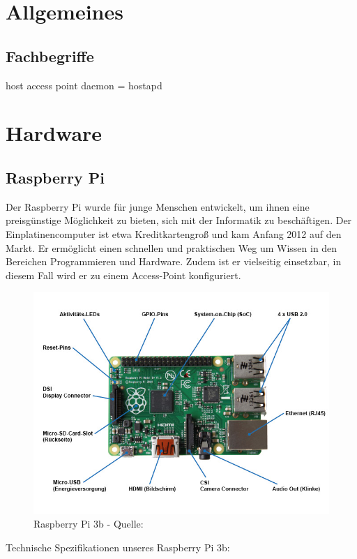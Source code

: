 \documentclass[a4paper,11pt,singlespacing]{article}
\begin{document}
    	\section{Allgemeines}
    	
    	\subsection{Fachbegriffe}
    	host access point daemon = hostapd
    	
      	\section{Hardware}
    		\subsection{Raspberry Pi}
    			Der Raspberry Pi wurde für junge Menschen entwickelt, um ihnen eine preisgünstige Möglichkeit zu bieten, sich mit der Informatik zu beschäftigen. Der Einplatinencomputer ist etwa Kreditkartengroß und kam Anfang 2012 auf den Markt. Er ermöglicht einen schnellen und praktischen Weg um Wissen in den Bereichen Programmieren und Hardware. Zudem ist er vielseitig einsetzbar, in diesem Fall wird er zu einem Access-Point konfiguriert. 
    			\begin{figure}[ht]
    				\centering
	    			\includegraphics[scale=0.5]{raspberry_pi_3b}
	    				\caption{Raspberry Pi 3b - Quelle: \cite{Picture_Raspberrypi3b} }
	    				\label{raspberrypi3b}
				\end{figure}
				Technische Spezifikationen unseres Raspberry Pi 3b:
\end{document}
